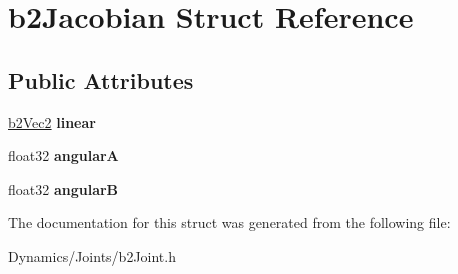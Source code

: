 \hypertarget{structb2Jacobian}{}\section{b2\+Jacobian Struct Reference}
\label{structb2Jacobian}
\subsection*{Public Attributes}
\begin{DoxyCompactItemize}
\item 
\mbox{\label{structb2Jacobian_aa63199b443d411972b9cb6aac6c7cb34}} 
\mbox{\hyperlink{structb2Vec2}{b2\+Vec2}} {\bfseries linear}
\item 
\mbox{\label{structb2Jacobian_a0669f849afcdc154b36f86cb0529d2bc}} 
float32 {\bfseries angularA}
\item 
\mbox{\label{structb2Jacobian_a3bbdbd8e46f4fa9be2e50434edaaeb14}} 
float32 {\bfseries angularB}
\end{DoxyCompactItemize}


The documentation for this struct was generated from the following file\+:\begin{DoxyCompactItemize}
\item 
Dynamics/\+Joints/b2\+Joint.\+h\end{DoxyCompactItemize}
